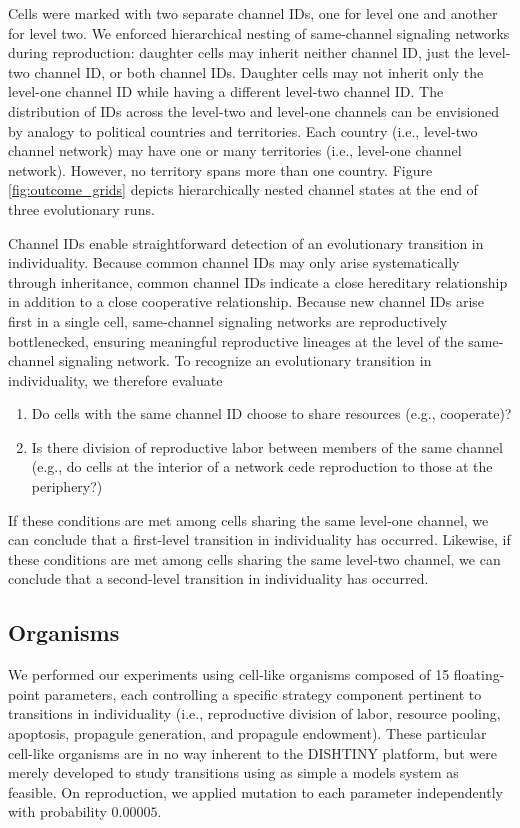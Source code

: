 Cells were marked with two separate channel IDs, one for level one and another for level two.
We enforced hierarchical nesting of same-channel signaling networks during reproduction:
daughter cells may inherit neither channel ID, just the level-two channel ID, or both channel IDs.
Daughter cells may not inherit only the level-one channel ID while having a different level-two channel ID.
The distribution of IDs across the level-two and level-one channels can be envisioned by analogy to political countries and territories.
Each country (i.e., level-two channel network) may have one or many territories (i.e., level-one channel network).
However, no territory spans more than one country.
Figure \ref{fig:outcome_grids} depicts hierarchically nested channel states at the end of three evolutionary runs.

Channel IDs enable straightforward detection of an evolutionary transition in individuality.
Because common channel IDs may only arise systematically through inheritance, common channel IDs indicate a close hereditary relationship in addition to a close cooperative relationship.
Because new channel IDs arise first in a single cell, same-channel signaling networks are reproductively bottlenecked, ensuring meaningful reproductive lineages at the level of the same-channel signaling network.
To recognize an evolutionary transition in individuality, we therefore evaluate
\begin{enumerate}
\item Do cells with the same channel ID choose to share resources (e.g., cooperate)?
\item Is there division of reproductive labor between members of the same channel (e.g., do cells at the interior of a network cede reproduction to those at the periphery?)
\end{enumerate}
If these conditions are met among cells sharing the same level-one channel, we can conclude that a first-level transition in individuality has occurred.
Likewise, if these conditions are met among cells sharing the same level-two channel, we can conclude that a second-level transition in individuality has occurred.

\subsection{Organisms}

We performed our experiments using cell-like organisms composed of 15 floating-point parameters, each controlling a specific strategy component pertinent to transitions in individuality (i.e., reproductive division of labor, resource pooling, apoptosis, propagule generation, and propagule endowment).
These particular cell-like organisms are in no way inherent to the DISHTINY platform, but were merely developed to study transitions using as simple a models system as feasible.
On reproduction, we applied mutation to each parameter independently with probability $0.00005$.


